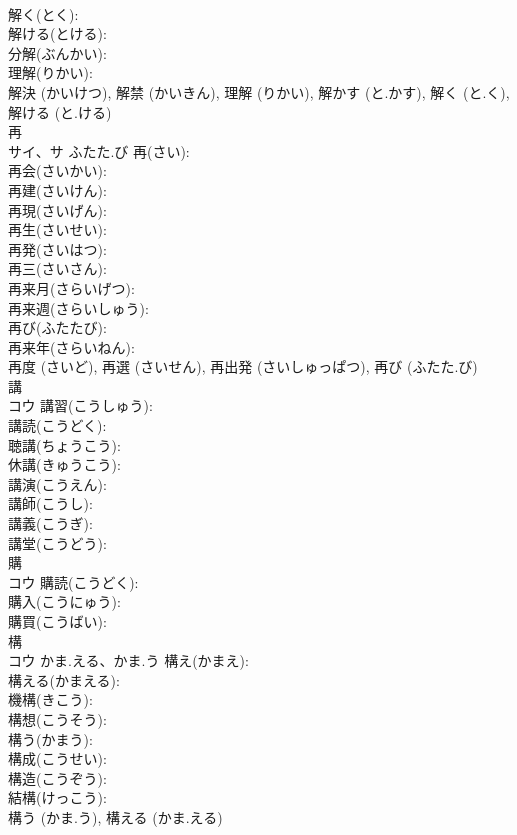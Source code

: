 \documentclass[8pt]{extreport}
\begin{document}
\begin{CJK}{UTF8}{min}
\\	解く(とく): 
\\	解ける(とける): 
\\	分解(ぶんかい): 
\\	理解(りかい): 
\\	解決 (かいけつ), 解禁 (かいきん), 理解 (りかい), 解かす (と.かす), 解く (と.く), 解ける (と.ける)
\\	再			
\\	サイ、サ	ふたた.び	再(さい): 
\\	再会(さいかい): 
\\	再建(さいけん): 
\\	再現(さいげん): 
\\	再生(さいせい): 
\\	再発(さいはつ): 
\\	再三(さいさん): 
\\	再来月(さらいげつ): 
\\	再来週(さらいしゅう): 
\\	再び(ふたたび): 
\\	再来年(さらいねん): 
\\	再度 (さいど), 再選 (さいせん), 再出発 (さいしゅっぱつ), 再び (ふたた.び)
\\	講			
\\	コウ		講習(こうしゅう): 
\\	講読(こうどく): 
\\	聴講(ちょうこう): 
\\	休講(きゅうこう): 
\\	講演(こうえん): 
\\	講師(こうし): 
\\	講義(こうぎ): 
\\	講堂(こうどう): 
\\	購			
\\	コウ		購読(こうどく): 
\\	購入(こうにゅう): 
\\	購買(こうばい): 
\\	構			
\\	コウ	かま.える、かま.う	構え(かまえ): 
\\	構える(かまえる): 
\\	機構(きこう): 
\\	構想(こうそう): 
\\	構う(かまう): 
\\	構成(こうせい): 
\\	構造(こうぞう): 
\\	結構(けっこう): 
\\	構う (かま.う), 構える (かま.える)

\end{CJK}
\end{document}
